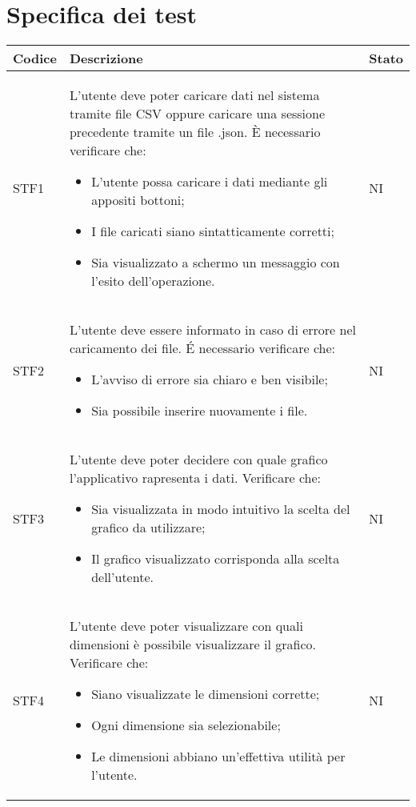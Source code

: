 \section{Specifica dei test}
    \begin{longtable}{|p{1.5cm}|p{11cm}|p{1cm}|} \hline
      \textbf{Codice} & \textbf{Descrizione} & \textbf{Stato} \\ \hline
        STF1 & L'utente deve poter caricare dati nel sistema tramite file CSV oppure caricare una sessione precedente tramite un file .json. \`E necessario verificare che: \begin{itemize}
            \item L'utente possa caricare i dati mediante gli appositi bottoni;
            \item I file caricati siano sintatticamente corretti;
            \item Sia visualizzato a schermo un messaggio con l'esito dell'operazione.
        \end{itemize} & NI\\ \hline
        
        STF2 & L'utente deve essere informato in caso di errore nel caricamento dei file. \'E necessario verificare che: \begin{itemize}
            \item L'avviso di errore sia chiaro e ben visibile;
            \item Sia possibile inserire nuovamente i file.
        \end{itemize} & NI\\ \hline

        STF3 & L'utente deve poter decidere con quale grafico l'applicativo rapresenta i dati. Verificare che: \begin{itemize}
            \item Sia visualizzata in modo intuitivo la scelta del grafico da utilizzare;
            \item Il grafico visualizzato corrisponda alla scelta dell'utente.
        \end{itemize} & NI\\ \hline

        STF4 & L'utente deve poter visualizzare con quali dimensioni è possibile visualizzare il grafico. Verificare che: \begin{itemize}
            \item Siano visualizzate le dimensioni corrette;
            \item Ogni dimensione sia selezionabile;
            \item Le dimensioni abbiano un'effettiva utilità per l'utente.
        \end{itemize} & NI\\ \hline


\end{longtable}
